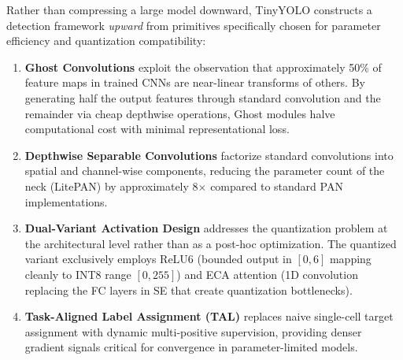 \documentclass[journal]{IEEEtran}
\begin{document}
Rather than compressing a large model downward, TinyYOLO constructs a detection framework \textit{upward} from primitives specifically chosen for parameter efficiency and quantization compatibility:
\begin{enumerate}
\item \textbf{Ghost Convolutions} \cite{han2020ghostnet} exploit the observation that approximately 50\% of feature maps in trained CNNs are near-linear transforms of others. By generating half the output features through standard convolution and the remainder via cheap depthwise operations, Ghost modules halve computational cost with minimal representational loss.
\item \textbf{Depthwise Separable Convolutions} \cite{howard2017mobilenets} factorize standard convolutions into spatial and channel-wise components, reducing the parameter count of the neck (LitePAN) by approximately 8$\times$ compared to standard PAN implementations.
\item \textbf{Dual-Variant Activation Design} addresses the quantization problem at the architectural level rather than as a post-hoc optimization. The quantized variant exclusively employs ReLU6 (bounded output in $[0, 6]$ mapping cleanly to INT8 range $[0, 255]$) and ECA attention (1D convolution replacing the FC layers in SE that create quantization bottlenecks).
\item \textbf{Task-Aligned Label Assignment (TAL)} \cite{feng2021tood} replaces naive single-cell target assignment with dynamic multi-positive supervision, providing denser gradient signals critical for convergence in parameter-limited models.
\end{enumerate}
\end{document}
